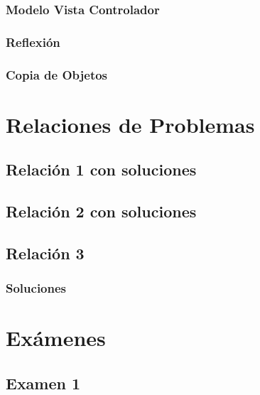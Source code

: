 \documentclass[a4paper,12pt]{article}
\begin{document}
\subsubsection{Modelo Vista Controlador}

\subsubsection{Reflexión}

\subsubsection{Copia de Objetos}



\section{Relaciones de Problemas}
\subsection{Relación 1 con soluciones}


\subsection{Relación 2 con soluciones}


\subsection{Relación 3}

\subsubsection{Soluciones}

\section{Exámenes}
\subsection{Examen 1}

\end{document}
